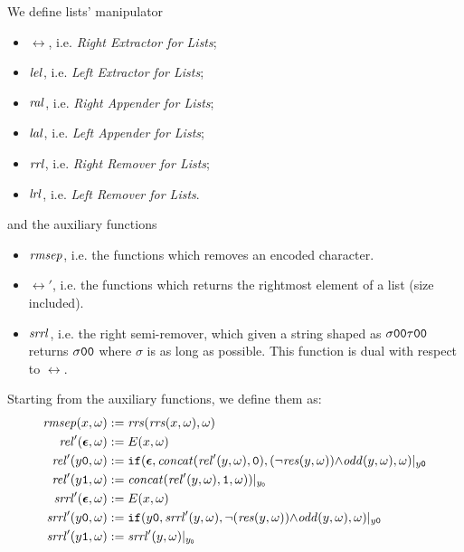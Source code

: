 %
\begin{defn}
  \label{def:listops}
    We define lists' manipulator
    \begin{itemize}
      \item $\rel$, i.e. \emph{Right Extractor for Lists};
      \item $\mathit{lel}$, i.e. \emph{Left Extractor for Lists};
      \item $\mathit{ral}$, i.e. \emph{Right Appender for Lists};
      \item $\mathit{lal}$, i.e. \emph{Left Appender for Lists};
      \item $\mathit{rrl}$, i.e. \emph{Right Remover for Lists};
      \item $\mathit{lrl}$, i.e. \emph{Left Remover for Lists}.
    \end{itemize}
    and the auxiliary functions
    \begin{itemize}
      \item $\mathit{rmsep}$, i.e. the functions which removes an encoded character.
      \item $\rel'$, i.e. the functions which returns the rightmost element
      of a list (size included).
      \item $\mathit{srrl}$, i.e. the right semi-remover, which given a
      string shaped as $\sigma\mathtt{0}\mathtt{0}\tau\mathtt{0}\mathtt{0}$ returns
      $\sigma\mathtt{0}\mathtt{0}$ where $\sigma$ is as long as possible.
      This function is dual with respect to $\rel$.
    \end{itemize}
    Starting from the auxiliary functions, we define them as:
    \begin{align*}
      \rmsep(x, \omega) &:= \rrs(\rrs(x, \omega), \omega)\\
      \rel'(\eepsilon,\omega) &:= E(x, \omega) \\
      \rel'(y\zero, \omega) &:= \mathtt{if}(\eepsilon,
      \concat(\rel'(y,\omega),\zero),
      (\lnot \res(y, \omega)){\wedge}
      \odd(y, \omega),\omega)|_{y\zero} \\
      \rel'(y\one,\omega) &:=
      \concat(\rel'(y,\omega),
      \one,\omega))|_{y_\zero}\\
      \srrl'(\eepsilon,\omega) &:= E(x, \omega)\\
      \srrl'(y\zero, \omega) &:= \mathtt{if}(y\zero,
      \srrl'(y, \omega),
      \lnot (\res(y, \omega)){\wedge}
      \odd(y, \omega),\omega)|_{y\zero} \\
      \srrl'(y\one,\omega) &:= \srrl'(y, \omega)|_{y_\zero}\\

\end{align*}
\end{defn}
